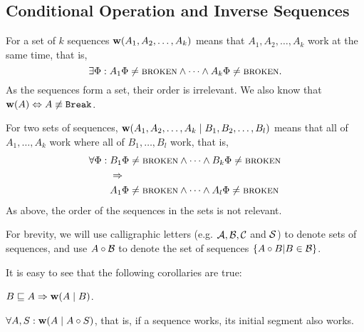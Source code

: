 

\subsection{Conditional Operation and Inverse Sequences}

\begin{mydef}[$\works{x}$]
For a set of $k$ sequences
$\mathbf{w}({A_1,A_2,\ldots,A_k})$ means that 
$A_1,A_2,\ldots,A_k$ work at the same time, that is,
\[\exists \Phi: A_1\Phi\neq\text{\normalfont\scshape{broken}} \wedge \cdots \wedge A_k\Phi\neq\text{\normalfont\scshape{broken}}.\]
As the sequences form a set, their order is irrelevant.
We also know that $\mathbf{w}({A}) \Leftrightarrow A\not\equiv \mathtt{Break}$. 
\end{mydef}

\begin{mydef}[$\worksc{x}{y}$]
For two sets of sequences, $\mathbf{w}({A_1,A_2,\ldots,A_k}\mathrel{|}{B_1,B_2,\ldots,B_l})$ means that 
all of $A_1,\ldots,A_k$ work where all of $B_1,\ldots,B_l$ work,
that is,
\begin{align*}
\forall \Phi:{}& 
B_1\Phi\neq\text{\normalfont\scshape{broken}} \wedge \cdots \wedge B_k\Phi\neq\text{\normalfont\scshape{broken}}\\
&\Rightarrow\\
&A_1\Phi\neq\text{\normalfont\scshape{broken}} \wedge \cdots \wedge A_l\Phi\neq\text{\normalfont\scshape{broken}}
\end{align*}
As above, the order of the sequences in the sets is not relevant.
\end{mydef}

\begin{mydef}
For brevity, we will use calligraphic letters (e.g. $\mathcal{A, B, C}$ and $\mathcal{S}$)
to denote sets of sequences,
and use $A\circ\mathcal{B}$ to denote the set of sequences $\{A\circ B|B\in\mathcal{B}\}$.
\end{mydef}

It is easy to see that the following corollaries are true:


\begin{mycor}
$B\sqsubseteq A \Rightarrow \mathbf{w}({A}\mathrel{|}{B})$.
\end{mycor}

\begin{mycor}\label{worksextpostfix}
$\forall A,S: \mathbf{w}({A}\mathrel{|}{A\circ S})$, that is, if a sequence works, its initial segment also works.
\end{mycor}

